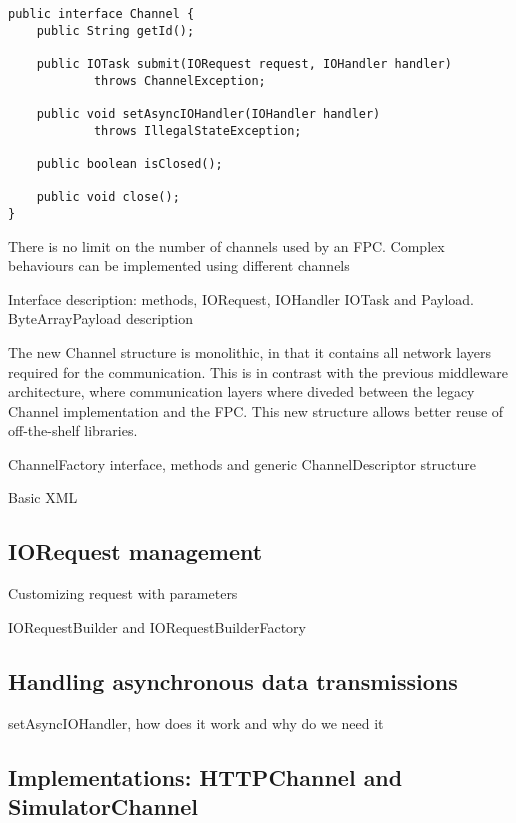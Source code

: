 \lstset{language=Java}
\begin{lstlisting}[float,floatplacement=H,caption=The Channel interface,label={lst:channel}]
public interface Channel {
	public String getId();
	
	public IOTask submit(IORequest request, IOHandler handler)
			throws ChannelException;
	
	public void setAsyncIOHandler(IOHandler handler)
			throws IllegalStateException;
			
	public boolean isClosed();
	
	public void close();		
}
\end{lstlisting}









There is no limit on the number of channels used by an FPC. Complex behaviours can be implemented using different channels

Interface description: methods, IORequest, IOHandler IOTask and Payload.
ByteArrayPayload description

The new Channel structure is monolithic, in that it contains all network layers required for the communication. This is in contrast with the previous middleware architecture, where communication layers where diveded between the legacy Channel implementation and the FPC. This new structure allows better reuse of off-the-shelf libraries.

ChannelFactory interface, methods and generic ChannelDescriptor structure

Basic XML 

\subsection{IORequest management}

Customizing request with parameters

IORequestBuilder and IORequestBuilderFactory

\subsection{Handling asynchronous data transmissions}

setAsyncIOHandler, how does it work and why do we need it

\subsection{Implementations: HTTPChannel and SimulatorChannel}

